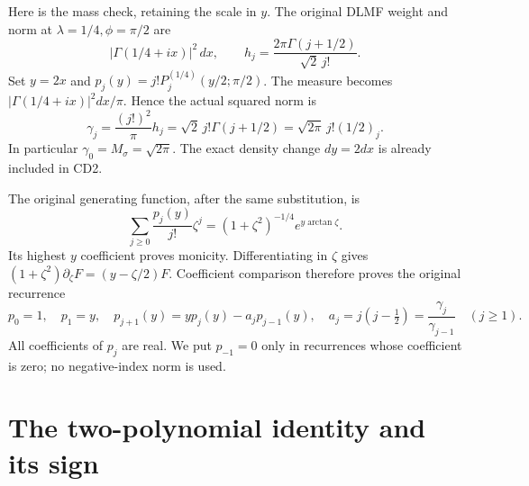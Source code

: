 Here is the mass check, retaining the scale in \(y\). The original DLMF
weight and norm at \(\lambda=1/4,\phi=\pi/2\) are
\[
 |\Gamma(1/4+ix)|^2\,dx,
 \qquad
 h_j=\frac{2\pi\Gamma(j+1/2)}{\sqrt2\,j!}.
\]
Set \(y=2x\) and
\(p_j(y)=j!P_j^{(1/4)}(y/2;\pi/2)\).
The measure becomes \(|\Gamma(1/4+ix)|^2dx/\pi\). Hence the actual
squared norm is
\begin{equation}\label{cdroot:eq:norm}
 \gamma_j=\frac{(j!)^2}{\pi}h_j
 =\sqrt2\,j!\Gamma(j+1/2)
 =\sqrt{2\pi}\,j!(1/2)_j.
 \tag{CD2}
\end{equation}
In particular \(\gamma_0=M_\sigma=\sqrt{2\pi}\). The exact density
change \(dy=2dx\) is already included in CD2.

The original generating function, after the same substitution, is
\[
 \sum_{j\geq0}\frac{p_j(y)}{j!}\zeta^j
 =(1+\zeta^2)^{-1/4}e^{y\arctan\zeta}.
\]
Its highest \(y\) coefficient proves monicity. Differentiating in
\(\zeta\) gives
\((1+\zeta^2)\partial_\zeta F=(y-\zeta/2)F\).
Coefficient comparison therefore proves the original recurrence
\begin{equation}\label{cdroot:eq:recurrence}
 p_0=1,\quad p_1=y,\quad
 p_{j+1}(y)=yp_j(y)-a_jp_{j-1}(y),
 \quad a_j=j(j-\tfrac12)=\frac{\gamma_j}{\gamma_{j-1}}
 \quad(j\geq1).
 \tag{CD3}
\end{equation}
All coefficients of \(p_j\) are real. We put \(p_{-1}=0\) only in
recurrences whose coefficient is zero; no negative-index norm is used.

\section{The two-polynomial identity and its sign}

